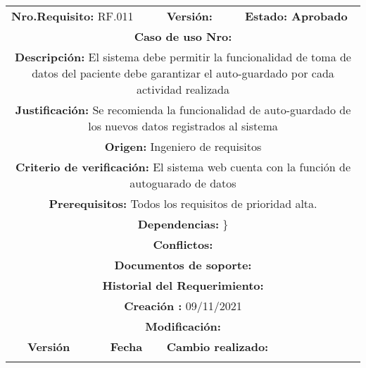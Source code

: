 \begin{center}
\begin{tabular}{|c|c|p{4cm}|p{4cm}|}
            \hline
            \rowcolor{red} \multicolumn{4}{|c|}{\textbf{Prioridad:} Alta}  \\
            \hline
            \multicolumn{2}{|l}{\textbf{Nro.Requisito: }RF.011} & \multicolumn{1}{|l}{\textbf{Versión: }} & \multicolumn{1}{|l|}{\textbf{Estado: Aprobado}} \\
            \multicolumn{4}{|p{13cm}|}{\textbf{Caso de uso Nro: }}  \\
            \hline
            \multicolumn{4}{|p{13cm}|}{\textbf{Descripción: } El sistema debe permitir la funcionalidad de toma de datos del paciente debe garantizar el auto-guardado por cada actividad realizada } \\
            \multicolumn{4}{|p{13cm}|}{\textbf{Justificación: } Se recomienda la funcionalidad de auto-guardado de los nuevos datos registrados al sistema} \\ 
            \multicolumn{4}{|p{13cm}|}{\textbf{Origen: }Ingeniero de requisitos}  \\
            \multicolumn{4}{|p{13cm}|}{\textbf{Criterio de verificación: } El sistema web cuenta con la función de autoguarado de datos} \\
            \hline
            \multicolumn{4}{|p{13cm}|}{\textbf{Prerequisitos: } Todos los requisitos de prioridad alta. }\\
            \hline \multicolumn{4}{|p{12cm}|}{\textbf{Dependencias: }
               \}
              }  \\
            \multicolumn{4}{|p{12cm}|}{\textbf{Conflictos: }}  \\
            \hline
            \multicolumn{4}{|p{12cm}|}{\textbf{Documentos de soporte: }}  \\
            \hline
            \multicolumn{4}{|p{12cm}|}{\textbf{Historial del Requerimiento: }}  \\
            \multicolumn{4}{|p{12cm}|}{\textbf{Creación : }09/11/2021}  \\
            \multicolumn{4}{|p{12cm}|}{\textbf{Modificación: }}  \\
             \textbf{Versión} & \textbf{Fecha} & \multicolumn{2}{p{8cm}|}{\textbf{Cambio realizado:}} \\
            \hline
                 & &   \multicolumn{2}{p{8cm}|}{}
              \\
            \hline
\end{tabular}







\end{center}
